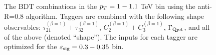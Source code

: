 \begin{figure}
\begin{center}
\caption{The BDT combinations in the $p_T = 1-1.1$ TeV bin using the anti-\kT R=0.8 algorithm. Taggers are combined with the following shape observables: $\tau_{21}^{(\beta=1)}+\tau_{32}^{(\beta=1)}$, $C_{2}^{(\beta=1)}+C_{3}^{(\beta=1)}$, $\Gamma_{\rm Qjet}$, and all of the above (denoted ``shape''). The inputs for each tagger are optimized for the $\varepsilon_{\rm sig}=0.3-0.35$ bin.}
\label{fig:pt1000_allcompare_AKt_R08_eps0_35}
\end{center}
\end{figure}


